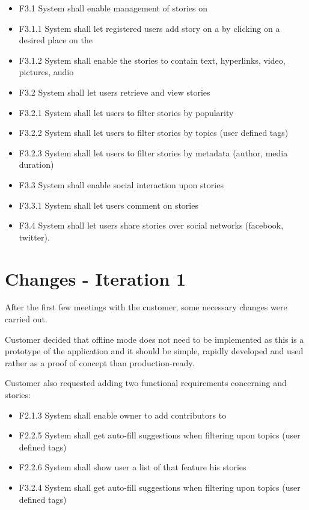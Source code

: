 \documentclass[11pt]{book}
\begin{document}
\begin{itemize}
  \item F3.1 System shall enable management of stories on \wallentityp
  \item F3.1.1 System shall let registered users add story on a \wallentitys by
  clicking on a desired place on the \wallentitys
  \item F3.1.2 System shall enable the stories to contain text, hyperlinks,
  video, pictures, audio
  \item F3.2 System shall let users retrieve and view stories
  \item F3.2.1 System shall let users to filter stories by popularity
  \item F3.2.2 System shall let users to filter stories by topics (user
  defined tags)
  \item F3.2.3 System shall let users to filter stories by metadata (author,
  media duration)
  \item F3.3 System shall enable social interaction upon stories
  \item F3.3.1 System shall let users comment on stories
  \item F3.4 System shall let users share stories over social networks
  (facebook, twitter).
\end{itemize}

\section{Changes - Iteration 1}\label{changes---iteration-1}

After the first few meetings with the customer, some necessary changes
were carried out.

Customer decided that offline mode does not need to be implemented as
this is a prototype of the application and it should be simple, rapidly
developed and used rather as a proof of concept than production-ready.

Customer also requested adding two functional requirements concerning
\wallentityp and stories:

\begin{itemize}
  \item F2.1.3 System shall enable owner to add contributors to \wallentitys
  \item F2.2.5 System shall get auto-fill suggestions when filtering upon
  topics (user defined tags)
  \item F2.2.6 System shall show user a list of \wallentityp that feature his stories
  \item F3.2.4 System shall get auto-fill suggestions when filtering upon
  topics (user defined tags)
\end{itemize}
\end{document}
